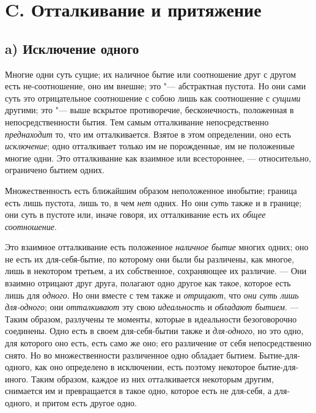 \bigskip

\section*{C. Отталкивание и притяжение}
\subsection*{a) Исключение одного}
Многие одни суть сущие; их наличное бытие или соотношение друг с другом есть
не-соотношение, оно им внешне; это "--- абстрактная пустота. Но они сами суть
это отрицательное соотношение с собою
лишь как соотношение с
{\em сущими} другими; это "--- выше вскрытое противоречие,
бесконечность, положенная в непосредственности бытия. Тем самым
отталкивание непосредственно {\em преднаходит} то, что
им отталкивается. Взятое в этом определении, оно есть
{\em исключение}; одно отталкивает только им не порожденные, 
им не положенные многие одни. Это отталкивание как взаимное
или всестороннее, — относительно, ограничено бытием одних.

Множественность есть ближайшим образом неположенное инобытие; граница есть
лишь пустота, лишь то, в чем {\em нет} одних. Но они
{\em суть} также и в границе; они суть в пустоте или,
иначе говоря, их отталкивание есть их {\em общее
соотношение}.

Это взаимное отталкивание есть положенное {\em наличное
бытие} многих одних; оно не есть их для-себя-бытие, по которому они были бы
различены, как многое, лишь в некотором третьем, а их собственное,
сохраняющее их различие. — Они взаимно отрицают друг друга, полагают одно
другое как такое, которое есть лишь для {\em одного}.
Но они вместе с тем также и {\em отрицают}, что
{\em они суть лишь для-одного}; они
{\em отталкивают} эту свою
{\em идеальность} и {\em обладают
бытием}. — Таким образом, разлучены те моменты, которые в идеальности
безоговорочно соединены. Одно есть в своем для-себя-бытии также и
{\em для-одного}, но это одно, для которого оно есть,
есть само же оно; его различение от себя непосредственно снято. Но во
множественности различенное одно обладает бытием. Бытие-для-одного, как оно
определено в исключении, есть поэтому некоторое бытие-для-иного. Таким
образом, каждое из них отталкивается некоторым другим, снимается им и
превращается в такое одно, которое есть не для-себя, а для-одного, и притом
есть другое одно.

